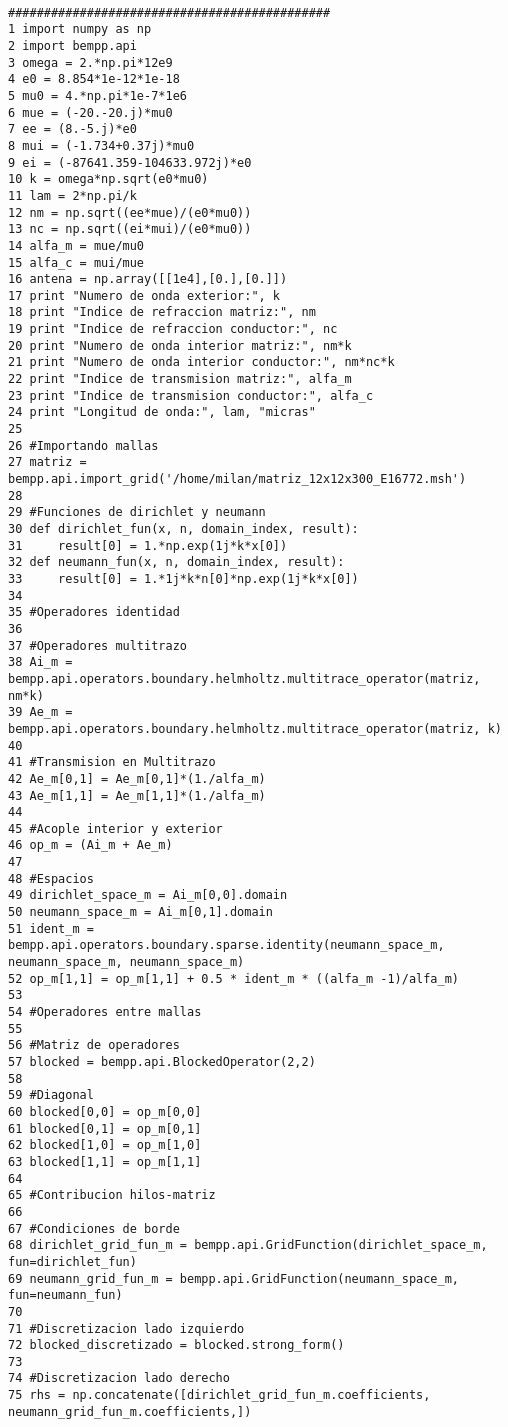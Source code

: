 \documentclass[12pt,letterpaper]{report}
\numberwithin{equation}{section}
\begin{document}
\begin{lstlisting}

#############################################
1 import numpy as np
2 import bempp.api
3 omega = 2.*np.pi*12e9
4 e0 = 8.854*1e-12*1e-18
5 mu0 = 4.*np.pi*1e-7*1e6
6 mue = (-20.-20.j)*mu0
7 ee = (8.-5.j)*e0
8 mui = (-1.734+0.37j)*mu0
9 ei = (-87641.359-104633.972j)*e0
10 k = omega*np.sqrt(e0*mu0)
11 lam = 2*np.pi/k
12 nm = np.sqrt((ee*mue)/(e0*mu0))
13 nc = np.sqrt((ei*mui)/(e0*mu0))
14 alfa_m = mue/mu0
15 alfa_c = mui/mue
16 antena = np.array([[1e4],[0.],[0.]])
17 print "Numero de onda exterior:", k
18 print "Indice de refraccion matriz:", nm
19 print "Indice de refraccion conductor:", nc
20 print "Numero de onda interior matriz:", nm*k
21 print "Numero de onda interior conductor:", nm*nc*k
22 print "Indice de transmision matriz:", alfa_m
23 print "Indice de transmision conductor:", alfa_c
24 print "Longitud de onda:", lam, "micras"
25 
26 #Importando mallas
27 matriz = bempp.api.import_grid('/home/milan/matriz_12x12x300_E16772.msh')
28 
29 #Funciones de dirichlet y neumann
30 def dirichlet_fun(x, n, domain_index, result):
31     result[0] = 1.*np.exp(1j*k*x[0])
32 def neumann_fun(x, n, domain_index, result):
33     result[0] = 1.*1j*k*n[0]*np.exp(1j*k*x[0])
34 
35 #Operadores identidad
36 
37 #Operadores multitrazo
38 Ai_m = bempp.api.operators.boundary.helmholtz.multitrace_operator(matriz, nm*k)
39 Ae_m = bempp.api.operators.boundary.helmholtz.multitrace_operator(matriz, k)
40 
41 #Transmision en Multitrazo
42 Ae_m[0,1] = Ae_m[0,1]*(1./alfa_m)
43 Ae_m[1,1] = Ae_m[1,1]*(1./alfa_m)
44 
45 #Acople interior y exterior
46 op_m = (Ai_m + Ae_m)
47 
48 #Espacios
49 dirichlet_space_m = Ai_m[0,0].domain
50 neumann_space_m = Ai_m[0,1].domain
51 ident_m = bempp.api.operators.boundary.sparse.identity(neumann_space_m, neumann_space_m, neumann_space_m)
52 op_m[1,1] = op_m[1,1] + 0.5 * ident_m * ((alfa_m -1)/alfa_m)
53 
54 #Operadores entre mallas
55 
56 #Matriz de operadores
57 blocked = bempp.api.BlockedOperator(2,2)
58 
59 #Diagonal
60 blocked[0,0] = op_m[0,0]
61 blocked[0,1] = op_m[0,1]
62 blocked[1,0] = op_m[1,0]
63 blocked[1,1] = op_m[1,1]
64 
65 #Contribucion hilos-matriz
66 
67 #Condiciones de borde
68 dirichlet_grid_fun_m = bempp.api.GridFunction(dirichlet_space_m, fun=dirichlet_fun)
69 neumann_grid_fun_m = bempp.api.GridFunction(neumann_space_m, fun=neumann_fun)
70 
71 #Discretizacion lado izquierdo
72 blocked_discretizado = blocked.strong_form()
73 
74 #Discretizacion lado derecho
75 rhs = np.concatenate([dirichlet_grid_fun_m.coefficients, neumann_grid_fun_m.coefficients,])

\end{lstlisting}
\end{document}
